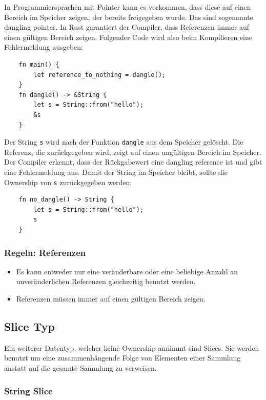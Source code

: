 In Programmiersprachen mit Pointer kann es vorkommen, dass diese auf einen Bereich im Speicher zeigen, der bereits freigegeben wurde. Das sind sogenannte \glqq dangling pointer\grqq{}. In Rust garantiert der Compiler, dass Referenzen immer auf einen gültigen Bereich zeigen. Folgender Code wird also beim Kompilieren eine Fehlermeldung ausgeben:

\begin{lstlisting}
    fn main() {
        let reference_to_nothing = dangle();
    }
    fn dangle() -> &String {
        let s = String::from("hello");
        &s
    }
\end{lstlisting}

Der String \verb"s" wird nach der Funktion \verb"dangle" aus dem Speicher gelöscht. Die Referenz, die zurückgegeben wird, zeigt auf einen ungültigen Bereich im Speicher. Der Compiler erkennt, dass der Rückgabewert eine \glqq dangling reference\grqq{} ist und gibt eine Fehlermeldung aus. Damit der String im Speicher bleibt, sollte die Ownership von \verb"s" zurückgegeben werden:

\begin{lstlisting}
    fn no_dangle() -> String {
        let s = String::from("hello");
        s
    }
\end{lstlisting}

\subsubsection{Regeln: Referenzen}

\begin{itemize}
    \item Es kann entweder nur eine veränderbare oder eine beliebige Anzahl an unveränderlichen Referenzen gleichzeitig benutzt werden.
    \item Referenzen müssen immer auf einen gültigen Bereich zeigen.
\end{itemize}

\subsection{Slice Typ}

Ein weiterer Datentyp, welcher keine Ownership annimmt sind Slices. Sie werden benutzt um eine zusammenhängende Folge von Elementen einer Sammlung anstatt auf die gesamte Sammlung zu verweisen.

\subsubsection{String Slice}

